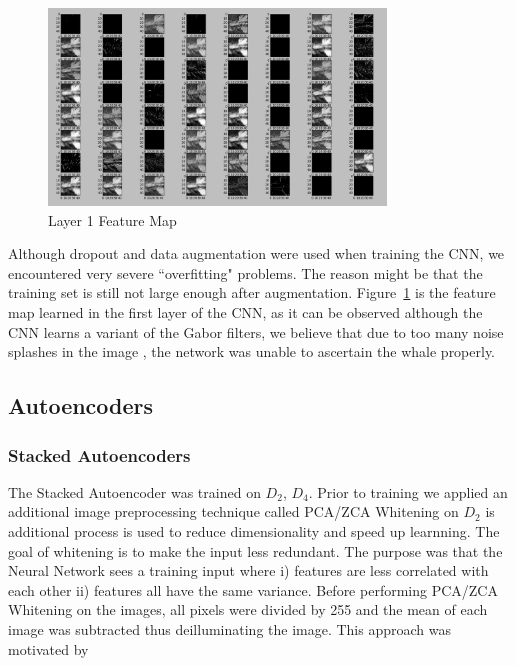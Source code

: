 \begin{figure}[H]
	\centering
	\includegraphics[width=0.8\textwidth]{sections/imgs/cnn/fmap.jpg}
	\caption{Layer 1 Feature Map}
	\label{fig:cnn_feature_map}
\end{figure}

Although dropout and data augmentation were used when training the CNN, we encountered very severe ``overfitting" problems. The reason might be that the training set is still not large enough after augmentation. Figure~\ref{fig:cnn_feature_map} is the feature map learned in the first layer of the CNN, as it can be observed although the CNN learns a variant of the Gabor filters, we believe that due to too many noise splashes in the image , the network was unable to ascertain the whale properly.



\subsection{Autoencoders}
\subsubsection{Stacked Autoencoders}
\label{subsec:stacked_autoencoders}

The Stacked Autoencoder was trained on $D_{2}$, $D_{4}$. Prior to training we applied an additional image preprocessing technique called PCA/ZCA Whitening on $D_{2}$ is additional process is used to reduce dimensionality and speed up learnning. The goal of whitening is to make the input less redundant. The purpose was  that the Neural Network sees a training input where i) features are less correlated with each other ii) features all have the same variance. Before performing PCA/ZCA Whitening on the images, all pixels were divided by 255 and the mean of each image was subtracted thus deilluminating the image. This approach was motivated by \cite{pcaWhitening}

